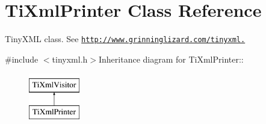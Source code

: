 \hypertarget{class_ti_xml_printer}{
\section{TiXmlPrinter Class Reference}
\label{class_ti_xml_printer}
}


TinyXML class. See \href{http://www.grinninglizard.com/tinyxml.}{\tt http://www.grinninglizard.com/tinyxml.}  


{\ttfamily \#include $<$tinyxml.h$>$}Inheritance diagram for TiXmlPrinter::\begin{figure}[H]
\begin{center}
\leavevmode
\includegraphics[height=2cm]{class_ti_xml_printer}
\end{center}
\end{figure}

